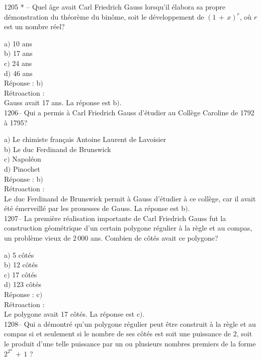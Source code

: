 ﻿\documentclass[letterpaper, 12pt]{article}
\begin{document}
1205 * -- Quel \^age avait Carl Friedrich Gauss lorsqu'il \'elabora
sa propre d\'emonstration du th\'eor\`eme du bin\^ome, soit le
d\'eveloppement de $(1\,+\,x)^r$, o\`u $r$ est un nombre r\'eel?

a$)$ 10 ans \\
b$)$ 17 ans \\
c$)$ 24 ans \\
d$)$ 46 ans\\

R\'eponse : b$)$\\

R\'etroaction : \\
Gauss avait 17 ans.
La r\'eponse est b$)$.\\

1206-- Qui a permis \`a Carl Friedrich Gauss d'\'etudier au
Coll\`ege Caroline de 1792 \`a 1795?

a$)$ Le chimiste fran\c cais Antoine Laurent de Lavoisier \\
b$)$ Le duc Ferdinand de Brunswick \\
c$)$ Napol\'eon \\
d$)$ Pinochet\\

R\'eponse : b$)$\\

R\'etroaction : \\
Le duc Ferdinand de Brunswick permit \`a Gauss d'\'etudier \`a ce
coll\`ege, car il avait \'et\'e \'emerveill\'e par les prouesses de
Gauss.
La r\'eponse est b$)$.\\

1207-- La premi\`ere r\'ealisation importante de Carl Friedrich
Gauss fut la construction g\'eom\'etrique d'un certain polygone
r\'egulier \`a la r\`egle et au compas, un probl\`eme vieux de
$2\,000$ ans. Combien de c\^ot\'es avait ce polygone?

a$)$ 5 c\^ot\'es\\
b$)$ 12 c\^ot\'es\\
c$)$ 17 c\^ot\'es\\
d$)$ 123 c\^ot\'es\\

R\'eponse : c$)$\\

R\'etroaction : \\
Le polygone avait 17 c\^ot\'es.
La r\'eponse est c$)$.\\

1208-- Qui a d\'emontr\'e qu'un polygone r\'egulier peut \^etre
construit \`a la r\`egle et au compas si et seulement si le nombre
de ses c\^ot\'es est soit une puissance de $2$, soit le produit
d'une telle puissance par un ou plusieurs nombres premiers de la
forme $2^{2^n}\,+\,1$ ?
\end{document}

